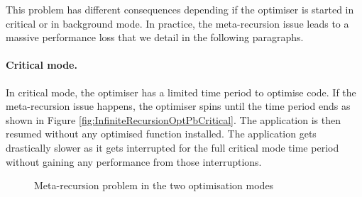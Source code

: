 \documentclass[a4paper,12pt,twoside]{../includes/ThesisStyle}
\begin{document}
This problem has different consequences depending if the optimiser is started in critical or in background mode. In practice, the meta-recursion issue leads to a massive performance loss that we detail in the following paragraphs.

\paragraph{Critical mode.} In critical mode, the optimiser has a limited time period to optimise code. If the meta-recursion issue happens, the optimiser spins until the time period ends as shown in Figure \ref{fig:InfiniteRecursionOptPbCritical}. The application is then resumed without any optimised function installed. The application gets drastically slower as it gets interrupted for the full critical mode time period without gaining any performance from those interruptions.

\begin{figure}[h!]
    \begin{center}
		\hspace{1cm}
		
		\caption{Meta-recursion problem in the two optimisation modes}
    \end{center}
\end{figure}
\end{document}
